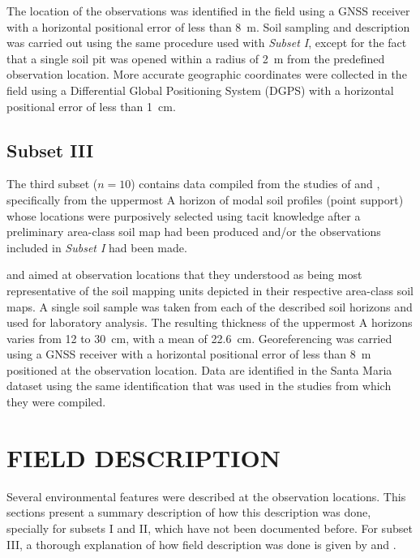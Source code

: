 The location of the observations was identified in the field using a GNSS receiver with a horizontal 
positional error of less than \SI{8}{\metre}. Soil sampling and description was carried out using the same 
procedure used with \emph{Subset I}, except for the fact that a single soil pit was opened within a radius of 
\SI{2}{\m} from the predefined observation location. More accurate geographic coordinates were collected in 
the field using a Differential Global Positioning System (DGPS) with a horizontal positional error of less 
than \SI{1}{\centi\metre}.

\subsection{Subset III}

The third subset ($n = 10$) contains data compiled from the studies of \citet{Pedron2005} and 
\citet{Miguel2010}, specifically from the uppermost A horizon of modal soil profiles (point support) whose 
locations were purposively selected using tacit knowledge after a preliminary area-class soil map had been 
produced and/or the observations included in \emph{Subset I} had been made.

\citet{Pedron2005} and \citet{Miguel2010} aimed at observation locations that they understood as being most 
representative of the soil mapping units depicted in their respective area-class soil maps. A single soil 
sample was taken from each of the described soil horizons and used for laboratory analysis. The resulting 
thickness of the uppermost A horizons varies from \num{12} to \SI{30}{\centi\metre}, with a mean of 
\SI{22.6}{\centi\metre}. Georeferencing was carried using a GNSS receiver with a horizontal positional error 
of less than \SI{8}{\metre} positioned at the observation location. Data are identified in the Santa Maria 
dataset using the same identification that was used in the studies from which they were compiled.

\section{FIELD DESCRIPTION}

Several environmental features were described at the observation locations. This sections present a summary
description of how this description was done, specially for subsets I and II, which have not been documented 
before. For subset III, a thorough explanation of how field description was done is given by 
\citet{Pedron2005} and \citet{Miguel2010}.

